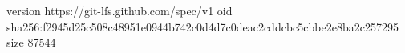 version https://git-lfs.github.com/spec/v1
oid sha256:f2945d25c508c48951e0944b742c0d4d7c0deac2cddcbc5cbbe2e8ba2c257295
size 87544
